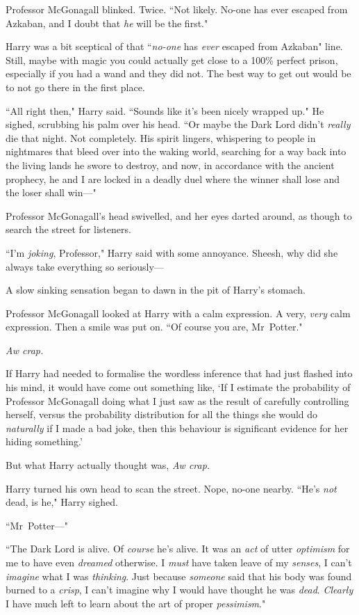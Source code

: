 Professor McGonagall blinked. Twice. ``Not likely. No-one has ever escaped from Azkaban, and I doubt that \emph{he} will be the first."

Harry was a bit sceptical of that ``\emph{no-one} has \emph{ever} escaped from Azkaban" line. Still, maybe with magic you could actually get close to a 100\% perfect prison, especially if you had a wand and they did not. The best way to get out would be to not go there in the first place.

``All right then," Harry said. ``Sounds like it's been nicely wrapped up." He sighed, scrubbing his palm over his head. ``Or maybe the Dark Lord didn't \emph{really} die that night. Not completely. His spirit lingers, whispering to people in nightmares that bleed over into the waking world, searching for a way back into the living lands he swore to destroy, and now, in accordance with the ancient prophecy, he and I are locked in a deadly duel where the winner shall lose and the loser shall win—"

Professor McGonagall's head swivelled, and her eyes darted around, as though to search the street for listeners.

``I'm \emph{joking}, Professor," Harry said with some annoyance. Sheesh, why did she always take everything so seriously—

A slow sinking sensation began to dawn in the pit of Harry's stomach.

Professor McGonagall looked at Harry with a calm expression. A very, \emph{very} calm expression. Then a smile was put on. ``Of course you are, Mr~Potter."

\emph{Aw crap.}

If Harry had needed to formalise the wordless inference that had just flashed into his mind, it would have come out something like, `If I estimate the probability of Professor McGonagall doing what I just saw as the result of carefully controlling herself, versus the probability distribution for all the things she would do \emph{naturally} if I made a bad joke, then this behaviour is significant evidence for her hiding something.'

But what Harry actually thought was, \emph{Aw crap.}

Harry turned his own head to scan the street. Nope, no-one nearby. ``He's \emph{not} dead, is he," Harry sighed.

``Mr~Potter—"

``The Dark Lord is alive. Of \emph{course} he's alive. It was an \emph{act} of utter \emph{optimism} for me to have even \emph{dreamed} otherwise. I \emph{must} have taken leave of my \emph{senses}, I can't \emph{imagine} what I was \emph{thinking}. Just because \emph{someone} said that his body was found burned to a \emph{crisp}, I can't imagine why I would have thought he was \emph{dead}. \emph{Clearly} I have much left to learn about the art of proper \emph{pessimism}."

